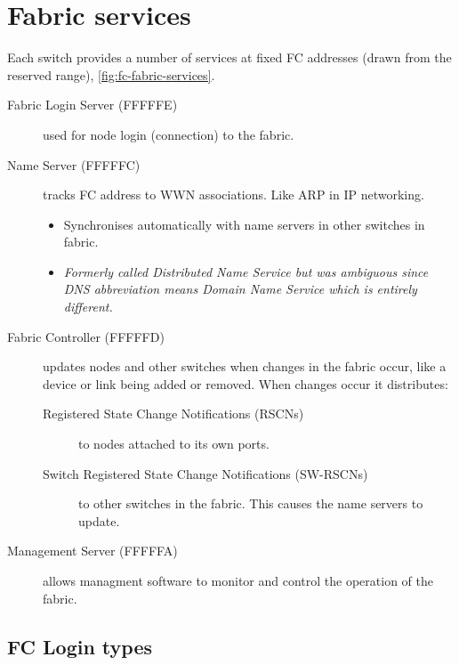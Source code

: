 \section{Fabric services}
\label{sec:fabric-services}

Each switch provides a number of services at fixed FC addresses (drawn
from the reserved range), \autoref{fig:fc-fabric-services}.


\begin{description}
\item[Fabric Login Server (FFFFFE)]
used for node login (connection) to the fabric.
\item[Name Server (FFFFFC)]
tracks FC address to WWN associations. Like ARP in IP networking.

\begin{itemize}
\item
  Synchronises automatically with name servers in other switches in
  fabric.
\item
  \emph{Formerly called Distributed Name Service but was ambiguous since
  DNS abbreviation means Domain Name Service which is entirely
  different.}
\end{itemize}
\item[Fabric Controller (FFFFFD)]
updates nodes and other switches when changes in the fabric occur, like
a device or link being added or removed. When changes occur it
distributes:

\begin{description}
\item[Registered State Change Notifications (RSCNs)]
to nodes attached to its own ports.
\item[Switch Registered State Change Notifications (SW-RSCNs)]
to other switches in the fabric. This causes the name servers to update.
\end{description}
\item[Management Server (FFFFFA)]
allows managment software to monitor and control the operation of the
fabric.
\end{description}

\subsection{FC Login types}
\label{sec:fc-login-types}

